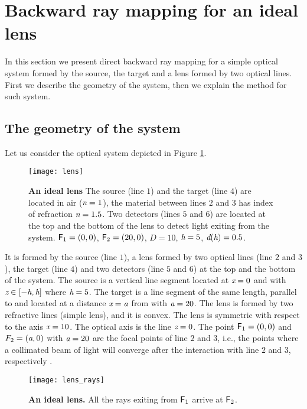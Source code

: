 \section{Backward ray mapping for an ideal lens}
In this section we present direct backward ray mapping for a simple optical system formed by the source, the target and a lens formed by two optical lines.
First we describe the geometry of the system, then we explain the method for such system.
\subsection{The geometry of the system}
Let us consider the optical system depicted in Figure \ref{fig:lens}. 
\begin{figure}[t]
  \begin{center}
  \texttt{[image: lens]}
  \end{center}
  \caption{\textbf{An ideal lens}
The source (line $1$) and the target (line $4$) are located in air ($\textit{n} = 1$), the material between lines $2$ and $3$ has index of refraction $\textit{n}=1.5$. 
Two detectors (lines $5$ and $6$) are located at the top and the bottom of the lens to detect light exiting from the system. $\textsf{F}_1 = (0,0)$, $\textsf{F}_2 = (20,0)$, $D=10$, $\textit{h}=5$, $\textit{d}(\textit{h})=0.5$.}
\label{fig:lens}
 \end{figure}
It is formed by the source (line $1$), a lens formed by two optical lines (line $2$ and $3$), the target (line $4$) and two detectors (line $5$ and $6$) at the top and the bottom of the system. The source  is a vertical line segment located at $\textit{x}=0$ and with 
$\textit{z}\in[-\textit{h}, \textit{h}]$ where $\textit{h}=5$. The target  is a line segment of the same length, parallel to  and located at a distance $\textit{x}=\textit{a}$ from  with $\textit{a} = 20$. The lens is formed by two refractive lines (simple lens), and it is convex.
The lens is symmetric with respect to the axis $\textit{x}=10$. The optical axis is the line $\textit{z}=0$. The point $\textsf{F}_1 = (0,0)$ and $F_2 = (\textit{a}, 0)$ with $\textit{a} = 20$ are the focal points of line $2$ and $3$, i.e., the points where a collimated beam of light will converge after the interaction with line $2$ and $3$, respectively \cite{leutz2012nonimaging}. 
\begin{figure}[t]
  \begin{center}
  \texttt{[image: lens\_rays]}
  \end{center}
  \caption{\textbf{An ideal lens.} 
All the rays exiting from $\textsf{F}_1$ arrive at $\textsf{F}_2$.}
\label{fig:real-lens}
 \end{figure}
